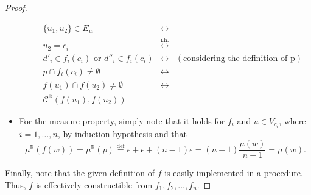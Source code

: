 \documentclass{article}
\newcommand{\R}{\mathbb{R}}
\newcommand{\bcont}{\mathcal{C}^\R}
\newcommand{\eqdef}{\stackrel{\text{def}}{=}}
\newcommand{\equivih}{\stackrel{\text{i.h.}}{\leftrightarrow}}
\begin{document}
\begin{proof}
\begin{itemize}
\begin{itemize}
      \begin{align*}
        \{u_1, u_2\} \in E_w &\leftrightarrow \\
        u_2 = c_i &\equivih \\
        d'_i \in f_i(c_i) \text{ or } d''_i \in f_i(c_i) &\leftrightarrow &(\text{considering the definition of p}) \\
        p \cap f_i(c_i) \neq \emptyset &\leftrightarrow \\
        f(u_1) \cap f(u_2) \neq \emptyset &\leftrightarrow \\
        \bcont(f(u_1), f(u_2))
      \end{align*}
    \end{itemize}
  \item For the measure property, simply note that it holds for $f_i$ and $u \in V_{c_i}$, where $i = 1, \dots, n$, by induction hypothesis and that
    \begin{equation*}
      \mu^\R(f(w)) = \mu^\R(p) \eqdef \epsilon + \epsilon + (n - 1)\epsilon = (n+1) \frac{\mu(w)}{n + 1} = \mu(w).
    \end{equation*}
  \end{itemize}
Finally, note that the given definition of $f$ is easily implemented in a procedure. Thus, $f$ is effectively constructible from $f_1, f_2, \dots, f_n$.
\end{proof}
\end{document}
